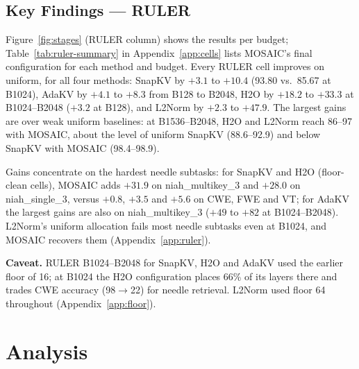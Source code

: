 \documentclass[11pt]{article}
\begin{document}
\subsection{Key Findings — RULER}
\label{sec:ruler}

Figure~\ref{fig:stages} (RULER column) shows the results per budget; Table~\ref{tab:ruler-summary} in Appendix~\ref{app:cells} lists MOSAIC's final configuration for each method and budget. Every RULER cell improves on uniform, for all four methods: SnapKV by $+3.1$ to $+10.4$ (93.80 vs.\ 85.67 at B1024), AdaKV by $+4.1$ to $+8.3$ from B128 to B2048, H2O by $+18.2$ to $+33.3$ at B1024--B2048 ($+3.2$ at B128), and L2Norm by $+2.3$ to $+47.9$. The largest gains are over weak uniform baselines: at B1536--B2048, H2O and L2Norm reach 86--97 with MOSAIC, about the level of uniform SnapKV (88.6--92.9) and below SnapKV with MOSAIC (98.4--98.9).

Gains concentrate on the hardest needle subtasks: for SnapKV and H2O (floor-clean cells), MOSAIC adds $+31.9$ on niah\_multikey\_3 and $+28.0$ on niah\_single\_3, versus $+0.8$, $+3.5$ and $+5.6$ on CWE, FWE and VT; for AdaKV the largest gains are also on niah\_multikey\_3 ($+49$ to $+82$ at B1024--B2048). L2Norm's uniform allocation fails most needle subtasks even at B1024, and MOSAIC recovers them (Appendix~\ref{app:ruler}).

\textbf{Caveat.} RULER B1024--B2048 for SnapKV, H2O and AdaKV used the earlier floor of 16; at B1024 the H2O configuration places 66\% of its layers there and trades CWE accuracy (98$\rightarrow$22) for needle retrieval. L2Norm used floor 64 throughout (Appendix~\ref{app:floor}).




\section{Analysis}

\end{document}
